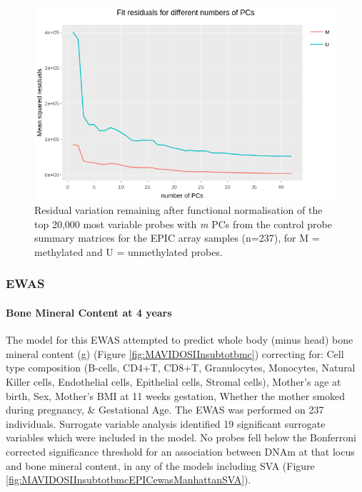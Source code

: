 \documentclass[
]{book}
\begin{document}
\begin{figure}

{\centering \includegraphics[width=0.8\linewidth]{figs/MAVIDOS-II-funnormPCsEPIC} 

}

\caption{Residual variation remaining after functional normalisation of the top 20,000 most variable probes with \emph{m} PCs from the control probe summary matrices for the EPIC array samples (n=237), for M = methylated and U = unmethylated probes.}\label{fig:MAVIDOSIIfunnormPCsEPIC}
\end{figure}



\hypertarget{ewas}{%
\subsubsection{EWAS}\label{ewas}}

\hypertarget{bone-mineral-content-at-4-years}{%
\paragraph{Bone Mineral Content at 4 years}\label{bone-mineral-content-at-4-years}}

The model for this EWAS attempted to predict whole body (minus head) bone mineral content (g) (Figure \ref{fig:MAVIDOSIInsubtotbmc}) correcting for: Cell type composition (B-cells, CD4+T, CD8+T, Granulocytes, Monocytes, Natural Killer cells, Endothelial cells, Epithelial cells, Stromal cells), Mother's age at birth, Sex, Mother's BMI at 11 weeks gestation, Whether the mother smoked during pregnancy, \& Gestational Age.
The EWAS was performed on 237 individuals.
Surrogate variable analysis identified 19 significant surrogate variables which were included in the model.
No probes fell below the Bonferroni corrected significance threshold for an association between DNAm at that locus and bone mineral content, in any of the models including SVA (Figure \ref{fig:MAVIDOSIInsubtotbmcEPICewasManhattanSVA}).
\end{document}
